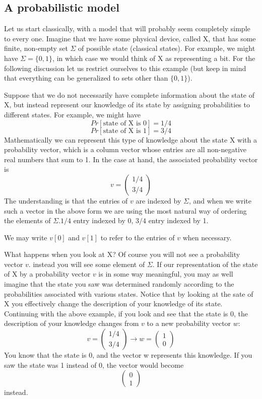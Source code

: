 \documentclass[12pt, oneside]{book}
\theoremstyle{definition}
\theoremstyle{definition}
\theoremstyle{remark}
\begin{document}
\subsection{A probabilistic model}
Let us start classically, with a model that will probably seem completely simple to every one. Imagine that we have some physical device, called X, that has some finite, non-empty set $\Sigma$ of possible state (classical states). For example, we might have $\Sigma = \{0,1\}$, in which case we would think of X as representing a bit. For the following discussion let us restrict ourselves to this example (but keep in mind that everything can be generalized to sets other than $\{0,1\}$).

Suppose that we do not necessarily have complete information about the state of X, but instead represent our knowledge of its state by assigning probabilities to different states. For example, we might have
\[
Pr[\text{state of X is 0}]=1/4
\]
\[
Pr[\text{state of X is 1}]=3/4
\]
Mathematically we can represent this type of knowledge about the state X with a probability vector, which is a column vector whose entries are all non-negative real numbers that sum to 1. In the case at hand, the associated probability vector is
\[
v=\begin{pmatrix} 1/4 \\ 3/4 \end{pmatrix}
\]
The understanding is that the entries of $v$ are indexed by $\Sigma$, and when we write such a vector in the above form we are using the most natural way of ordering the elements of $\Sigma$.$1/4$ entry indexed by 0, $3/4$ entry indexed by 1.

We may write $v[0]$ and $v[1]$ to refer to the entries of $v$ when necessary.

What happens when you look at X? Of course you will not see a probability vector $v$. instead you will see some element of $\Sigma$. If our representation of the state of X by a probability vector $v$ is in some way meaningful, you may as well imagine that the state you saw was determined randomly according to the probabilities associated with various states. Notice that by looking at the sate of X you effectively change the description of your knowledge of its state. Continuing with the above example, if you look and see that the state is 0, the description of your knowledge changes from $v$ to a new probability vector $w$:
\[
v=\begin{pmatrix} 1/4 \\ 3/4 \end{pmatrix} \rightarrow w=\begin{pmatrix} 1 \\ 0 \end{pmatrix}
\]
You know that the state is 0, and the vector w represents this knowledge. If you saw the state was 1 instead of 0, the vector would become
\[
\begin{pmatrix} 0 \\ 1 \end{pmatrix}
\]
instead.
\end{document}
